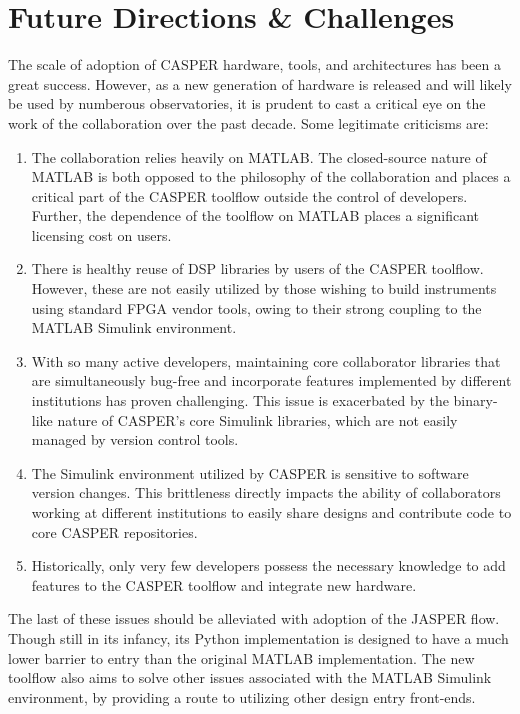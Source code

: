\documentclass{ws-jai}
\begin{document}
\section{Future Directions \& Challenges} \label{sec:Future}
The scale of adoption of CASPER hardware, tools, and architectures has been a great success. However, as a new generation of hardware is released and will likely be used by numberous observatories, it is prudent to cast a critical eye on the work of the collaboration over the past decade. Some legitimate criticisms are:
\begin{enumerate}
    \item The collaboration relies heavily on MATLAB. The closed-source nature of MATLAB is both opposed to the philosophy of the collaboration and places a critical part of the CASPER toolflow outside the control of developers. Further, the dependence of the toolflow on MATLAB places a significant licensing cost on users.

    \item There is healthy reuse of DSP libraries by users of the CASPER toolflow. However, these are not easily utilized by those wishing to build instruments using standard FPGA vendor tools, owing to their strong coupling to the MATLAB Simulink environment.

    \item With so many active developers, maintaining core collaborator libraries that are simultaneously bug-free and incorporate features implemented by different institutions has proven challenging. This issue is exacerbated by the binary-like nature of CASPER's core Simulink libraries, which are not easily managed by version control tools.

    \item The Simulink environment utilized by CASPER is sensitive to software version changes. This brittleness directly impacts the ability of collaborators working at different institutions to easily share designs and contribute code to core CASPER repositories.

    \item Historically, only very few developers possess the necessary knowledge to add features to the CASPER toolflow and integrate new hardware.
\end{enumerate}

The last of these issues should be alleviated with adoption of the JASPER flow. Though still in its infancy, its Python implementation is designed to have a much lower barrier to entry than the original MATLAB implementation. The new toolflow also aims to solve other issues associated with the MATLAB Simulink environment, by providing a route to utilizing other design entry front-ends.
\end{document}
